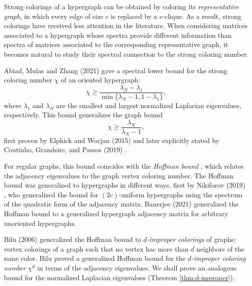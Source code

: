 \documentclass{article}
\theoremstyle{plain}
\theoremstyle{definition}
\theoremstyle{remark}
\begin{document}
Strong colorings of a hypergraph can be obtained by coloring its \emph{representative graph}, in which every edge of size $c$ is replaced by a $c$-clique. As a result, strong colorings have received less attention in the literature.
When considering matrices associated to a hypergraph whose spectra provide different information than spectra of matrices associated to the corresponding representative graph, it becomes natural to study their spectral connection to the strong coloring number.


Abiad, Mulas and Zhang (2021) \cite{Abiad20} gave a spectral lower bound for the strong coloring number $\chi$ of an oriented hypergraph:
\begin{equation}\label{eq:boundgen}
\chi\geq\frac{\lambda_N-\lambda_1}{\min\bigl\{\lambda_N-1,1-\lambda_1\bigr\}},
\end{equation}
where $\lambda_1$ and $\lambda_N$ are the smallest and largest normalized Laplacian eigenvalues, respectively.
This bound generalizes the graph bound
\begin{equation}
\chi\geq \frac{\lambda_N}{\lambda_N-1},
\end{equation}
first proven by Elphick and Wocjan (2015) \cite{ElphickWocjan2015} and later explicitly stated by Coutinho, Grandsire, and Passos (2019) \cite{Gabriel-colouring}.

For regular graphs, this bound coincides with the \emph{Hoffman bound} \cite{Hoffman1970}, which relates the adjacency eigenvalues to the graph vertex coloring number. The Hoffman bound was generalized to hypergraphs in different ways, first by Nikiforov (2019) \cite{nikiforov2019hoffman}, who generalized the bound for $(2c)$-uniform hypergraphs using the spectrum of the quadratic form of the adjacency matrix. Banerjee (2021) \cite{Banerjee2021} generalized the Hoffman bound to a generalized hypergraph adjacency matrix for arbitrary unoriented hypergraphs.

Bilu (2006) \cite{Bilu2006} generalized the Hoffman bound to \emph{$d$-improper colorings} of graphs: vertex colorings of a graph such that no vertex has more than $d$ neighbors of the same color. Bilu proved a generalized Hoffman bound for the \emph{$d$-improper coloring number} $\chi^d$ in terms of the adjacency eigenvalues. We shall prove an analogous bound for the normalized Laplacian eigenvalues (Theorem \ref{thm:d-improper}).
\end{document}
